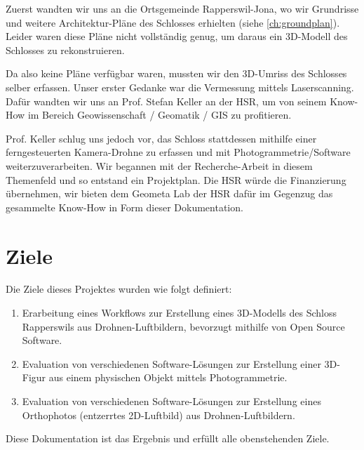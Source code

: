 Zuerst wandten wir uns an die Ortsgemeinde Rapperswil-Jona, wo wir Grundrisse
und weitere Architektur-Pläne des Schlosses erhielten (siehe
\autoref{ch:groundplan}). Leider waren diese Pläne nicht vollständig genug, um
daraus ein 3D-Modell des Schlosses zu rekonstruieren.

Da also keine Pläne verfügbar waren, mussten wir den 3D-Umriss des Schlosses
selber erfassen. Unser erster Gedanke war die Vermessung mittels Laserscanning.
Dafür wandten wir uns an Prof. Stefan Keller an der HSR, um von seinem Know-How
im Bereich Geowissenschaft / Geomatik / GIS zu profitieren.

Prof. Keller schlug uns jedoch vor, das Schloss stattdessen mithilfe einer
ferngesteuerten Kamera-Drohne zu erfassen und mit Photo\-grammetrie\-/Software
weiterzuverarbeiten. Wir begannen mit der Re\-cher\-che-Arbeit in diesem Themenfeld
und so entstand ein Projektplan. Die HSR würde die Finanzierung übernehmen, wir
bieten dem Geometa Lab der HSR dafür im Gegenzug das gesammelte Know-How in Form
dieser Dokumentation.


\section{Ziele}\label{sec:goals}

Die Ziele dieses Projektes wurden wie folgt definiert:

\begin{enumerate}
	\item Erarbeitung eines Workflows zur Erstellung eines 3D-Modells des Schloss
		Rapperswils aus Drohnen-Luftbildern, bevorzugt mithilfe von Open Source
		Software.
	\item Evaluation von verschiedenen Software-Lösungen zur Erstellung einer
		3D-Figur aus einem physischen Objekt mittels Photogrammetrie.
	\item Evaluation von verschiedenen Software-Lösungen zur Erstellung eines
		Orthophotos (entzerrtes 2D-Luftbild) aus Drohnen-Luft\-bil\-dern.
\end{enumerate}

\noindent Diese Dokumentation ist das Ergebnis und erfüllt alle obenstehenden Ziele.
